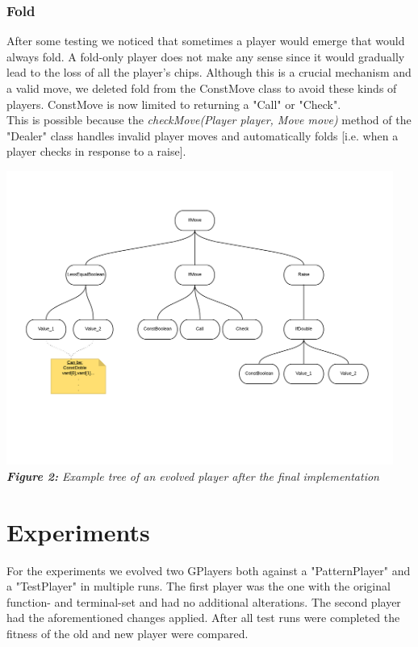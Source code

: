 \documentclass[12pt,fleqn,a4paper]{article}
\begin{document}
\subsubsection{Fold}
After some testing we noticed that sometimes a player would emerge that would always fold. A fold-only player does not make any sense since it would gradually lead to the loss of all the player's chips. Although this is a crucial mechanism and a valid move, we deleted fold from the ConstMove class to avoid these kinds of players. ConstMove is now limited to returning a "Call" or "Check". \\
This is possible because the \textit{checkMove(Player player, Move move)} method of the "Dealer" class handles invalid player moves and automatically folds [i.e. when a player checks in response to a raise].

\begin{center}
	\includegraphics[width=0.95\textwidth]{NewRaise.png}
	\textit{\textbf{Figure 2: }Example tree of an evolved player after the final implementation}
\end{center}

\newpage
\section{Experiments}
For the experiments we evolved two GPlayers both against a "PatternPlayer" and a "TestPlayer" in multiple runs. The first player was the one with the original function- and terminal-set and had no additional alterations. The second player had the aforementioned changes applied. After all test runs were completed the fitness of the old and new player were compared.
\end{document}
